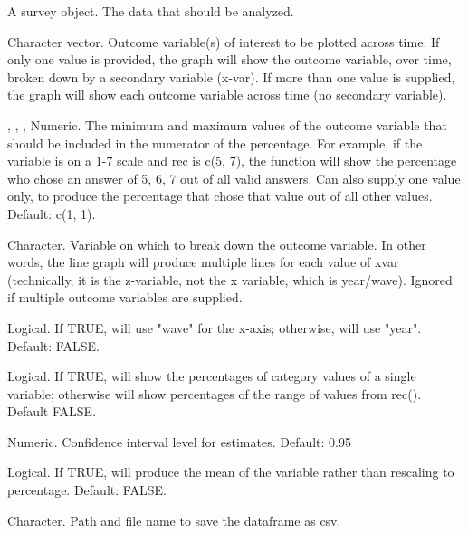 \documentclass[a4paper]{book}
\begin{document}
\begin{Arguments}
\begin{ldescription}
\item[\code{data}] A survey object.  The data that should be analyzed.

\item[\code{outcome}] Character vector.  Outcome variable(s) of interest to be plotted
across time.  If only one value is provided, the graph will show the outcome
variable, over time, broken down by a secondary variable (x-var).
If more than one value is supplied, the graph will show each outcome variable
across time (no secondary variable).

\item[\code{rec}, \code{rec2}, \code{rec3}, \code{rec4}] Numeric. The minimum and maximum values of the outcome
variable that should be included in the numerator of the percentage.
For example, if the variable is on a 1-7 scale and rec is c(5, 7), the
function will show the percentage who chose an answer of 5, 6, 7 out of
all valid answers.  Can also supply one value only, to produce the percentage
that chose that value out of all other values. Default: c(1, 1).

\item[\code{xvar}] Character. Variable on which to break down the outcome variable.
In other words, the line graph will produce multiple lines for each value of
xvar (technically, it is the z-variable, not the x variable, which is year/wave).
Ignored if multiple outcome variables are supplied.

\item[\code{use\_wave}] Logical.  If TRUE, will use "wave" for the x-axis; otherwise,
will use "year".  Default: FALSE.

\item[\code{use\_cat}] Logical. If TRUE, will show the percentages of category values
of a single variable; otherwise will show percentages of the range of values
from rec(). Default FALSE.

\item[\code{ci\_level}] Numeric. Confidence interval level for estimates.  Default: 0.95

\item[\code{mean}] Logical.  If TRUE, will produce the mean of the variable rather than
rescaling to percentage.  Default: FALSE.

\item[\code{filesave}] Character.  Path and file name to save the dataframe as csv.


\end{ldescription}
\end{Arguments}
\end{document}
